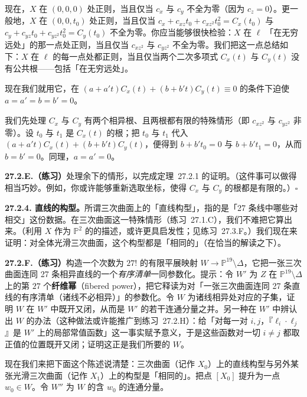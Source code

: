 现在，$X$ 在 $(0,0,0)$ 处正则，当且仅当 $c_{x}$ 与 $c_{y}$ 不全为零（因为 $c_{z}=0$）。更一般地，$X$ 在 $(0,0,t_{0})$ 处正则，当且仅当 $c_{x}+c_{xz}t_{0}+c_{xz^{2}}t_{0}^{2}=C_{x}(t_{0})$ 与 $c_{y}+c_{yz}t_{0}+c_{yz^{2}}t_{0}^{2}=C_{y}(t_{0})$ 不全为零。你应当能够很快检验：$X$ 在 $\ell$ 「在无穷远处」的那一点处正则，当且仅当 $c_{xz^{2}}$ 与 $c_{yz^{2}}$ 不全为零。我们把这一点总结如下：$X$ 在 $\ell$ 的每一点处都正则，当且仅当两个二次多项式 $C_{x}(t)$ 与 $C_{y}(t)$ 没有公共根——包括「在无穷远处」。

现在我们就用它，在 $(a+a't)C_{x}(t)+(b+b't)C_{y}(t)\equiv 0$ 的条件下迫使 $a=a'=b=b'=0$。

我们先处理 $C_{x}$ 与 $C_{y}$ 有两个相异根、且两根都有限的特殊情形（即 $c_{xz^{2}}$ 与 $c_{yz^{2}}$ 非零）。设 $t_{0}$ 与 $t_{1}$ 是 $C_{x}(t)$ 的根；把 $t_{0}$ 与 $t_{1}$ 代入 $(a+a't)C_{x}(t)+(b+b't)C_{y}(t)$，便得到 $b+b't_{0}=0$ 与 $b+b't_{1}=0$，从而 $b=b'=0$。同理，$a=a'=0$。

\textbf{27.2.E.（练习）}\quad 处理余下的情形，以完成\mbox{定理~27.2.1} 的证明。（这件事可以做得相当巧妙。例如，你或许能够重新选取坐标，使得 $C_{x}$ 与 $C_{y}$ 的根都是有限的。）\hfill$\square$

\textbf{27.2.4. 直线的构型。}\quad 所谓三次曲面上的「直线构型」，指的是「27 条线中哪些对相交」这份数据。在\trFermat{}三次曲面这一特殊情形（\mbox{练习~27.1.C}），我们不难把它算出来。（利用 $X$ 作为 $\mathbb{P}^{2}$ 的\trBlowup{}的描述，或许更具启发性；见\mbox{练习~27.3.F}。）我们现在来证明：对全体光滑三次曲面，这个构型都是「相同的」（在恰当的解读之下）。

\textbf{27.2.F.（练习）}\quad 构造一个次数为 $27!$ 的有限平展映射 $W\to\mathbb{P}^{19}\setminus\Delta$，它把一张三次曲面连同 27 条相异直线的一个\emph{有序清单}一同参数化。提示：令 $W'$ 为 $Z$ 在 $\mathbb{P}^{19}\setminus\Delta$ 上的第 $27$ 个\textbf{纤维幂}（fibered power），把它释读为对「一张三次曲面连同 27 条直线的有序清单（诸线不必相异）」的参数化。令 $W$ 为诸线相异处对应的子集，证明 $W$ 在 $W'$ 中既开又闭，从而是 $W'$ 的若干连通分量之并。另一种在 $W'$ 中辨认出 $W$ 的办法（这种做法或许能推广到\mbox{练习~27.2.H}）：给「对每一对 $i,j$，『$\ell_i\cdot\ell_j$』是 $W'$ 上的局部常值函数」这一事实赋予意义，于是这些函数对一切 $i\neq j$ 都取正值的位置既开又闭；证明这正是我们所要的 $W$。

现在我们来把下面这个陈述说清楚：\trFermat{}三次曲面（记作 $X_{0}$）上的直线构型与另外某张光滑三次曲面（记作 $X_{1}$）上的构型是「相同的」。把点 $[X_{0}]$ 提升为一点 $w_{0}\in W$。令 $W''$ 为 $W$ 的含 $w_{0}$ 的连通分量。

